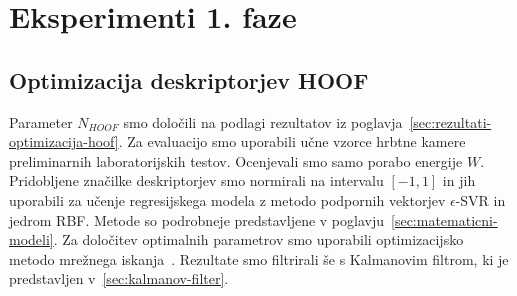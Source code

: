 \section{Eksperimenti 1. faze}

\subsection{Optimizacija deskriptorjev HOOF}\label{sec:optimizacija-hoof}
Parameter $N_{HOOF}$ smo določili na podlagi rezultatov iz poglavja~\ref{sec:rezultati-optimizacija-hoof}. Za evaluacijo smo uporabili učne vzorce hrbtne kamere preliminarnih laboratorijskih testov. Ocenjevali smo samo porabo energije $W$. Pridobljene značilke deskriptorjev smo normirali na intervalu $[-1,1]$ in jih uporabili za učenje regresijskega modela z metodo podpornih vektorjev $\epsilon$-SVR in jedrom RBF. Metode so podrobneje predstavljene v poglavju~\ref{sec:matematicni-modeli}. Za določitev optimalnih parametrov %
smo uporabili optimizacijsko metodo mrežnega iskanja~\cite{hsu2003practical}. Rezultate smo filtrirali še s Kalmanovim filtrom, ki je predstavljen v~\ref{sec:kalmanov-filter}.

